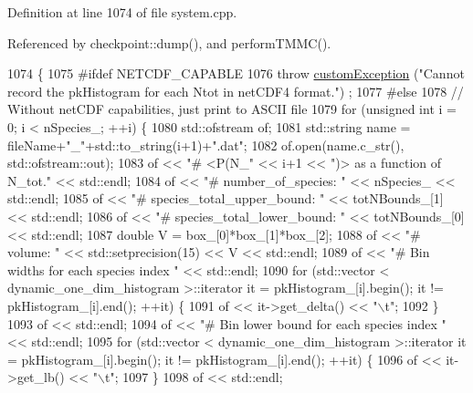 Definition at line 1074 of file system.\-cpp.



Referenced by checkpoint\-::dump(), and perform\-T\-M\-M\-C().


\begin{DoxyCode}
1074                                                                                 \{
1075 \textcolor{preprocessor}{#ifdef NETCDF\_CAPABLE}
1076 \textcolor{preprocessor}{}    \textcolor{keywordflow}{throw} \hyperlink{classcustom_exception}{customException} (\textcolor{stringliteral}{"Cannot record the pkHistogram for each Ntot in netCDF4 format."})
      ;
1077 \textcolor{preprocessor}{#else}
1078 \textcolor{preprocessor}{}    \textcolor{comment}{// Without netCDF capabilities, just print to ASCII file}
1079     \textcolor{keywordflow}{for} (\textcolor{keywordtype}{unsigned} \textcolor{keywordtype}{int} i = 0; i < nSpecies\_; ++i) \{
1080         std::ofstream of;
1081         std::string name = fileName+\textcolor{stringliteral}{"\_"}+std::to\_string(i+1)+\textcolor{stringliteral}{".dat"};
1082         of.open(name.c\_str(), std::ofstream::out);
1083         of << \textcolor{stringliteral}{"# <P(N\_"} << i+1 << \textcolor{stringliteral}{")> as a function of N\_tot."} << std::endl;
1084         of << \textcolor{stringliteral}{"# number\_of\_species: "} << nSpecies\_ << std::endl;
1085         of << \textcolor{stringliteral}{"# species\_total\_upper\_bound: "} << totNBounds\_[1] << std::endl;
1086         of << \textcolor{stringliteral}{"# species\_total\_lower\_bound: "} << totNBounds\_[0] << std::endl;
1087         \textcolor{keywordtype}{double} V = box\_[0]*box\_[1]*box\_[2];
1088         of << \textcolor{stringliteral}{"# volume: "} << std::setprecision(15) << V << std::endl;
1089         of << \textcolor{stringliteral}{"# Bin widths for each species index "} << std::endl;
1090         \textcolor{keywordflow}{for} (std::vector < dynamic\_one\_dim\_histogram >::iterator it = pkHistogram\_[i].begin(); it != 
      pkHistogram\_[i].end(); ++it) \{
1091             of << it->get\_delta() << \textcolor{stringliteral}{"\(\backslash\)t"};
1092         \}
1093         of << std::endl;
1094         of << \textcolor{stringliteral}{"# Bin lower bound for each species index "} << std::endl;
1095         \textcolor{keywordflow}{for} (std::vector < dynamic\_one\_dim\_histogram >::iterator it = pkHistogram\_[i].begin(); it != 
      pkHistogram\_[i].end(); ++it) \{
1096             of << it->get\_lb() << \textcolor{stringliteral}{"\(\backslash\)t"};
1097         \}
1098         of << std::endl;

\end{DoxyCode}
